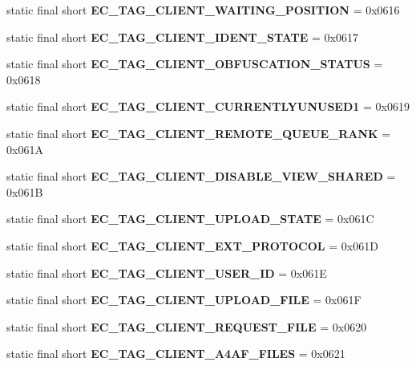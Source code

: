 \begin{DoxyCompactItemize}
\item 
static final short {\bfseries EC\_\-TAG\_\-CLIENT\_\-WAITING\_\-POSITION} = 0x0616\label{interfaceECCodes_a2f3b14a7041f7f053dac614d98f24b6a}

\item 
static final short {\bfseries EC\_\-TAG\_\-CLIENT\_\-IDENT\_\-STATE} = 0x0617\label{interfaceECCodes_a91094ac20e910201597db61b793ddd7a}

\item 
static final short {\bfseries EC\_\-TAG\_\-CLIENT\_\-OBFUSCATION\_\-STATUS} = 0x0618\label{interfaceECCodes_af77be06acf1126cd445fb837e7cc09c1}

\item 
static final short {\bfseries EC\_\-TAG\_\-CLIENT\_\-CURRENTLYUNUSED1} = 0x0619\label{interfaceECCodes_a990f6b11166cfb2458d3764135a521bb}

\item 
static final short {\bfseries EC\_\-TAG\_\-CLIENT\_\-REMOTE\_\-QUEUE\_\-RANK} = 0x061A\label{interfaceECCodes_a4f4592bd3eae845f13fccb24b7357e08}

\item 
static final short {\bfseries EC\_\-TAG\_\-CLIENT\_\-DISABLE\_\-VIEW\_\-SHARED} = 0x061B\label{interfaceECCodes_a53475c9868c7cc88a2e4c7c21fc53f8b}

\item 
static final short {\bfseries EC\_\-TAG\_\-CLIENT\_\-UPLOAD\_\-STATE} = 0x061C\label{interfaceECCodes_abed726bf30881781a89d5b74a8ef080d}

\item 
static final short {\bfseries EC\_\-TAG\_\-CLIENT\_\-EXT\_\-PROTOCOL} = 0x061D\label{interfaceECCodes_aef2935d089812dd7da69c72ceda33916}

\item 
static final short {\bfseries EC\_\-TAG\_\-CLIENT\_\-USER\_\-ID} = 0x061E\label{interfaceECCodes_a28b26b3ab7fc3c3ab25bb0493bfa64b7}

\item 
static final short {\bfseries EC\_\-TAG\_\-CLIENT\_\-UPLOAD\_\-FILE} = 0x061F\label{interfaceECCodes_a2c3ae46773ceb196f1ec4cd71280ca4f}

\item 
static final short {\bfseries EC\_\-TAG\_\-CLIENT\_\-REQUEST\_\-FILE} = 0x0620\label{interfaceECCodes_aff1dd581183cdfde395019ba8f59ffe4}

\item 
static final short {\bfseries EC\_\-TAG\_\-CLIENT\_\-A4AF\_\-FILES} = 0x0621\label{interfaceECCodes_a0eec35a063f25e3d997ce37b9b4bd977}


\end{DoxyCompactItemize}
